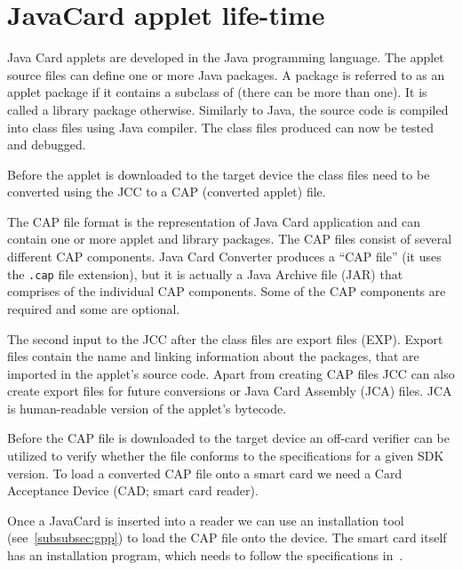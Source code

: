 \section{JavaCard applet life-time}\label{sec:jc:lifecycle}




Java Card applets are developed in the Java programming language. The applet source files can define one or more Java packages. A package is referred to as an applet package if it contains a subclass of  (there can be more than one). It is called a library package otherwise.  Similarly to Java, the source code is compiled into class files using Java compiler. The class files produced can now be tested and debugged.

Before the applet is downloaded to the target device the class files need to be converted using the JCC to a CAP (converted applet) file. 

The CAP file format is the representation of Java Card application and can contain one or more applet and library packages. The CAP files consist of several different CAP components. Java Card Converter produces a ``CAP file'' (it uses the \texttt{.cap} file extension), but it is actually a Java Archive file (JAR) that comprises of the individual CAP components. Some of the CAP components are required and some are optional.

The second input to the JCC after the class files are export files (EXP). Export files contain the name and linking information about the packages, that are imported in the applet's source code.
Apart from creating CAP files JCC can also create export files for future conversions or Java Card Assembly (JCA) files. JCA is human-readable version of the applet's bytecode.

Before the CAP file is downloaded to the target device an off-card verifier can be utilized to verify whether the file conforms to the specifications for a given SDK version. To load a converted CAP file onto a smart card we need a Card Acceptance Device (CAD; smart card reader). 

Once a JavaCard is inserted into a reader we can use an installation tool (see~\ref{subsubsec:gpp}) to load the CAP file onto the device. The smart card itself has an installation program, which needs to follow the specifications in~\cite{jcspecs31download}.

